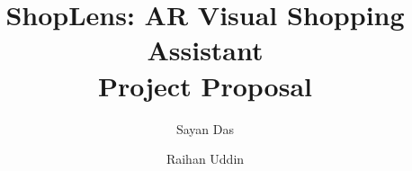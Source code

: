 \documentclass[12pt]{report}
\title{ShopLens: AR Visual Shopping Assistant \\ Project Proposal}
\author{
  Sayan Das
  \and
  Raihan Uddin
}
\begin{document}


\restoregeometry


\end{document}
